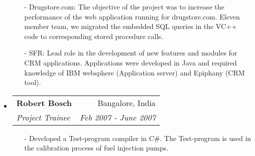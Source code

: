 \documentclass[letterpaper,9pt]{article}
\makeatletter
\newcommand{\ressubheading}[4]{
\begin{tabular*}{7.0in}{l@{\extracolsep{\fill}}r}
		\textbf{#1} & #2 \\
		\textit{#3} & \textit{#4} \\
\end{tabular*}\vspace{-6pt}}
\makeatother
\begin{document}
\begin{itemize}
\begin{itemize}
\item[-]Drugstore.com: The objective of the project was to increase the performance of the web application running for drugstore.com. Eleven member team, we migrated the embedded SQL queries in the VC++ code to corresponding stored procedure calls. 

\item[-]SFR: Lead role in the development of new features and modules for CRM applications. Applications were developed in Java and required knowledge of IBM websphere (Application server) and Epiphany (CRM tool).     

\end{itemize}

\item
	\ressubheading{Robert Bosch}{Bangalore, India}{Project Trainee}{Feb 2007 - June 2007}
\begin{itemize}
\item[-] Developed a Test-program compiler in C\#. The Test-program is used in the calibration process of fuel injection pumps.
\end{itemize}

\end{itemize}
\end{document}
